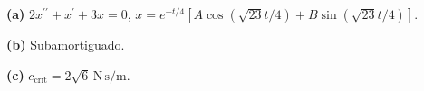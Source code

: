 \noindent\textbf{(a)} \(2x^{\prime\prime}+x^{\prime}+3x=0\), \(x=e^{-t/4}[A\cos(\sqrt{23}t/4)+B\sin(\sqrt{23}t/4)]\).

\noindent\textbf{(b)} Subamortiguado.

\noindent\textbf{(c)} \(c_{\mathrm{crit}}=2\sqrt6\,\mathrm{N\,s/m}\).
